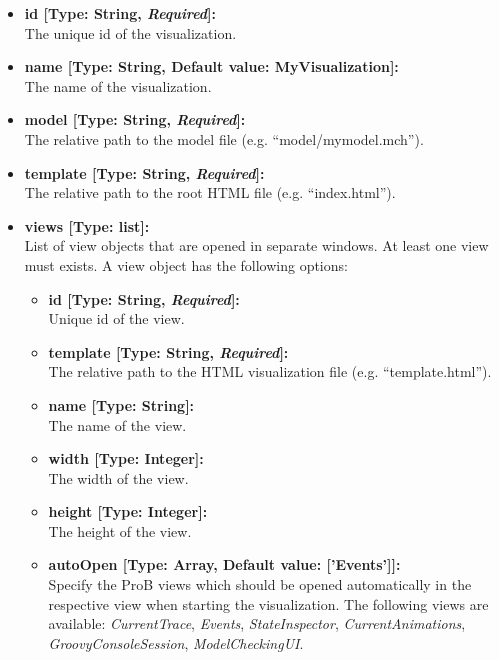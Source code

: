 \begin{itemize}
	\item[] \textbf{id [Type: String, \textit{Required}]:}\\The unique id of the visualization.
	\item[] \textbf{name [Type: String, Default value: MyVisualization]:}\\The name of the visualization.
	\item[] \textbf{model [Type: String, \textit{Required}]:}\\The relative path to the model file (e.g. ``model/mymodel.mch'').
	\item[] \textbf{template [Type: String, \textit{Required}]:}\\The relative path to the root HTML file (e.g. ``index.html'').
	\item[] \textbf{views [Type: list]:}\\ List of view objects that are opened in separate windows.
	At least one view must exists.
	A view object has the following options:
	\begin{itemize}
		\item[] \textbf{id [Type: String, \textit{Required}]:}\\ Unique id of the view.
		\item[] \textbf{template [Type: String, \textit{Required}]:}\\ The relative path to the HTML visualization file (e.g. ``template.html'').
		\item[] \textbf{name [Type: String]:}\\ The name of the view.
		\item[] \textbf{width [Type: Integer]:}\\ The width of the view.
		\item[] \textbf{height [Type: Integer]:}\\ The height of the view.
		\item[] \textbf{autoOpen [Type: Array, Default value: ['Events']]:}\\Specify the ProB views which should be opened automatically in the respective view when starting the visualization. 
The following views are available: \textit{CurrentTrace}, \textit{Events}, \textit{StateInspector}, \textit{CurrentAnimations}, \textit{GroovyConsoleSession}, \textit{ModelCheckingUI}.
	\end{itemize}
\end{itemize}

